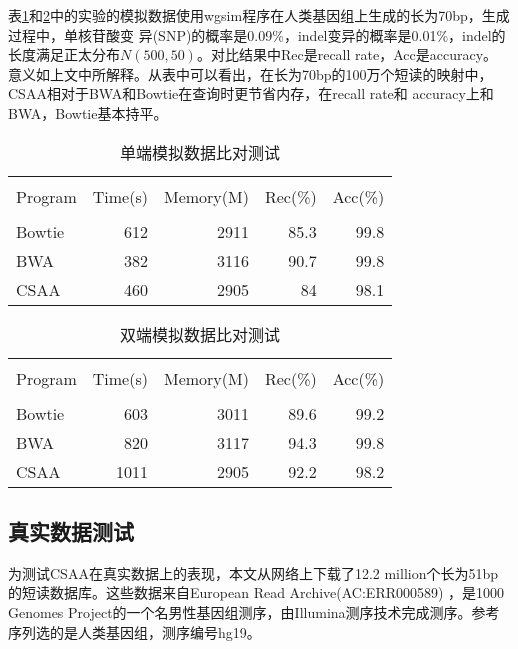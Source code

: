 表\ref{tab:singleend}和\ref{tab:pairend}中的实验的模拟数据使用wgsim程序在人类基因组上生成的长为70bp，生成过程中，单核苷酸变
异(SNP)的概率是0.09\%，indel变异的概率是0.01\%，indel的长度满足正太分布$N(500,50)$。对比结果中Rec是recall rate，Acc是accuracy。
意义如上文中所解释。从表中可以看出，在长为70bp的100万个短读的映射中，CSAA相对于BWA和Bowtie在查询时更节省内存，在recall rate和
accuracy上和BWA，Bowtie基本持平。%


\begin{table}[htbp]
    \caption{单端模拟数据比对测试}
    \label{tab:singleend}
    \centering
    \begin{tabular}{lrrrr}
       \toprule \\
       Program&Time(s)&Memory(M)&Rec(\%)&Acc(\%)\\
       \midrule \\
       Bowtie&612&2911&85.3&99.8\\
       BWA&382&3116&90.7&99.8\\
       CSAA&460&2905&84&98.1\\
       \bottomrule
    \end{tabular}
\end{table}


\begin{table}[htbp]
    \caption{双端模拟数据比对测试}
    \label{tab:pairend}
    \centering
    \begin{tabular}{lrrrr}
       \toprule \\
       Program&Time(s)&Memory(M)&Rec(\%)&Acc(\%)\\
       \midrule \\
       Bowtie&603&3011&89.6&99.2\\
       BWA&820&3117&94.3&99.8\\
       CSAA&1011&2905&92.2&98.2\\
       \bottomrule
    \end{tabular}
\end{table}

\subsection{真实数据测试}
为测试CSAA在真实数据上的表现，本文从网络上下载了12.2 million个长为51bp的短读数据库。这些数据来自European Read Archive(AC:ERR000589)
，是1000 Genomes Project的一个名男性基因组测序，由Illumina测序技术完成测序。参考序列选的是人类基因组，测序编号hg19。

